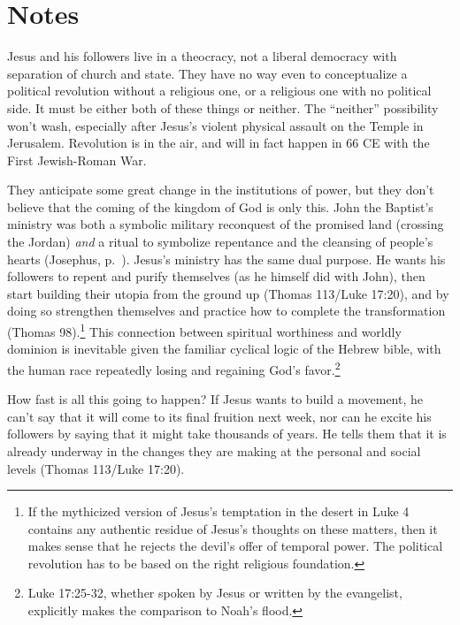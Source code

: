 \documentclass[10pt,a5paper,twoside]{article}
\newcommand{\quotesize}{\normalsize{}}
\newcommand{\maintextquotesize}{\renewcommand{\quotesize}{\large{}}}
\newcommand{\notequotesize}{\renewcommand{\quotesize}{\normalsize{}}}
\newcommand{\intex}[1]{\index[texts]{#1}}
\newcommand{\reftex}[1]{#1\intex{#1}}
\newenvironment{notesection}[1]{
  \setcounter{secnumdepth}{0}          %
  \section*{#1}
  \setcounter{secnumdepth}{2}          %
  \notequotesize
}%
{
  \maintextquotesize
}
\begin{document}
\begin{notesection}{Notes}
Jesus and his followers live in a theocracy, not a liberal democracy with separation of church and state.
They have no way even to conceptualize a political revolution without a religious one, or
a religious one with no political side. It must be either both of these things or neither.
The ``neither'' possibility won't wash, especially after Jesus's violent physical assault on
the Temple in Jerusalem.
Revolution is in the air, and will in fact happen in 66 CE with the First Jewish-Roman War.

They anticipate some great change in the institutions of power, but they don't believe
that the coming of the kingdom of God is only this. John the Baptist's ministry was both
a symbolic military reconquest of the promised land (crossing the Jordan) \emph{and}
a ritual to symbolize repentance and the cleansing of people's hearts (Josephus, p.~\pageref{josephus-baptism}).
Jesus's ministry has the same dual purpose.
He wants his followers to repent and purify themselves (as he himself did with John), then
start building their utopia from the ground up (Thomas 113/Luke 17:20), and
by doing so strengthen themselves and practice how to complete the transformation (Thomas 98).\footnote{If the
mythicized version of Jesus's temptation in the desert in Luke 4 contains any authentic residue of Jesus's
thoughts on these matters, then it makes sense that he rejects the devil's offer of temporal power. The political revolution
has to be based on the right religious foundation.}
This connection between spiritual worthiness and worldly dominion is inevitable given the
familiar cyclical logic of the Hebrew bible, with the human race repeatedly losing and
regaining God's favor.\footnote{\reftex{Luke 17:25-32}, whether spoken by Jesus or written by the evangelist,
explicitly makes the comparison to Noah's flood.}

How fast is all this going to happen? If Jesus wants to build a movement, he can't say that
it will come to its final fruition next week, nor can he excite his followers by saying that
it might take thousands of years. He tells them that it is already underway in the changes
they are making at the personal and social levels (Thomas 113/Luke 17:20).


\end{notesection}
\end{document}
